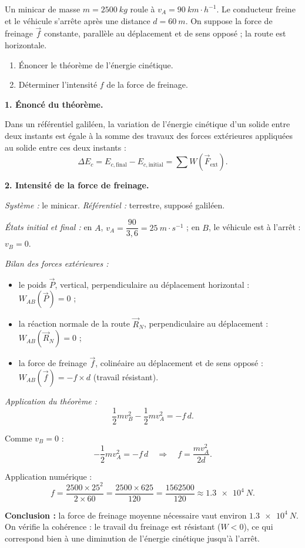 \documentclass[11pt]{article}
\begin{document}
\begin{exoresolu}
Un minicar de masse $m = \SI{2500}{kg}$ roule à $v_A = \SI{90}{km\cdot h^{-1}}$. Le conducteur freine et le véhicule s'arrête après une distance $d = \SI{60}{m}$. On suppose la force de freinage $\vec{f}$ constante, parallèle au déplacement et de sens opposé ; la route est horizontale.
\begin{enumerate}
\item Énoncer le théorème de l'énergie cinétique.
\item Déterminer l'intensité $f$ de la force de freinage.
\end{enumerate}
\tcblower
\textbf{1. Énoncé du théorème.}

Dans un référentiel galiléen, la variation de l'énergie cinétique d'un solide entre deux instants est égale à la somme des travaux des forces extérieures appliquées au solide entre ces deux instants :
\[ \Delta E_c = E_{c,\mathrm{final}} - E_{c,\mathrm{initial}} = \sum W(\vec{F}_{\mathrm{ext}}). \]

\textbf{2. Intensité de la force de freinage.}

\textit{Système :} le minicar. \textit{Référentiel :} terrestre, supposé galiléen.

\textit{États initial et final :} en $A$, $v_A = \dfrac{90}{3,6} = \SI{25}{m\cdot s^{-1}}$ ; en $B$, le véhicule est à l'arrêt : $v_B = 0$.

\textit{Bilan des forces extérieures :}
\begin{itemize}
\item le poids $\vec{P}$, vertical, perpendiculaire au déplacement horizontal : $W_{AB}(\vec{P}) = 0$ ;
\item la réaction normale de la route $\vec{R}_N$, perpendiculaire au déplacement : $W_{AB}(\vec{R}_N) = 0$ ;
\item la force de freinage $\vec{f}$, colinéaire au déplacement et de sens opposé : $W_{AB}(\vec{f}) = -f\times d$ (travail résistant).
\end{itemize}

\textit{Application du théorème :}
\[ \frac{1}{2}mv_B^2 - \frac{1}{2}mv_A^2 = -f\,d. \]

Comme $v_B = 0$ :
\[ -\frac{1}{2}mv_A^2 = -f\,d \quad\Longrightarrow\quad f = \frac{mv_A^2}{2d}. \]

Application numérique :
\[ f = \frac{2500 \times 25^2}{2\times 60} = \frac{2500 \times 625}{120} = \frac{\num{1562500}}{120} \approx \SI{1,3e4}{N}. \]

\textbf{Conclusion :} la force de freinage moyenne nécessaire vaut environ $\SI{1,3e4}{N}$. On vérifie la cohérence : le travail du freinage est résistant ($W<0$), ce qui correspond bien à une diminution de l'énergie cinétique jusqu'à l'arrêt.
\end{exoresolu}
\end{document}
